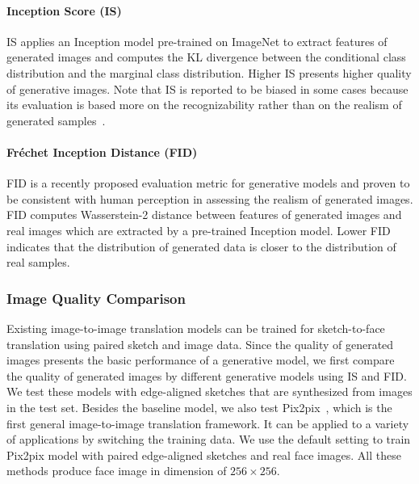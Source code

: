 \paragraph{Inception Score (IS)}
IS applies an Inception model pre-trained on ImageNet to extract features of generated images and computes the KL divergence between the conditional class distribution and the marginal class distribution. Higher IS presents higher quality of generative images.
Note that IS is reported to be biased in some cases because its evaluation is based more on the recognizability rather than on the realism of generated samples~\cite{evaluation}. 

\paragraph{Fréchet Inception Distance (FID)}
FID is a recently proposed evaluation metric for generative models and proven to be consistent with human perception in assessing the realism of generated images. FID computes Wasserstein-2 distance between features of generated images and real images which are extracted by a pre-trained Inception model. Lower FID indicates that the distribution of generated data is closer to the distribution of real samples.




\subsubsection{Image Quality Comparison}
Existing image-to-image translation models can be trained for sketch-to-face translation using paired sketch and image data. 
Since the quality of generated images presents the basic performance of a generative model, we first compare the quality of generated images by different generative models using IS and FID. 
We test these models with edge-aligned sketches that are synthesized from images in the test set. 
Besides the baseline model, we also test Pix2pix~\cite{pix2pix}, which is the first general image-to-image translation framework. It can be applied to a variety of applications by switching the training data. 
We use the default setting to train Pix2pix model with paired edge-aligned sketches and real face images. 
All these methods produce face image in dimension of $256\times256$.

